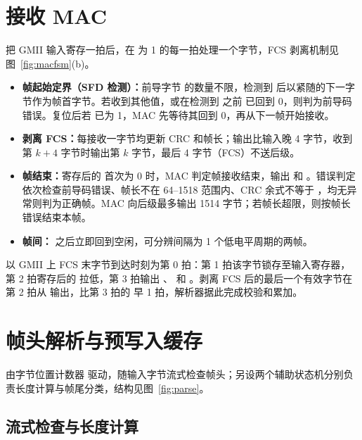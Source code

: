 \section{接收 MAC}\label{sec:macrx}

 把 GMII 输入寄存一拍后，在  为 1 的每一拍处理一个字节，FCS 剥离机制见图~\ref{fig:macfsm}(b)。
\begin{itemize}
  \item \textbf{帧起始定界（SFD 检测）：}前导字节  的数量不限，检测到  后以紧随的下一字节作为帧首字节。若收到其他值，或在检测到  之前  已回到 0，则判为前导码错误。复位后若  已为 1，MAC 先等待其回到 0，再从下一帧开始接收。
  \item \textbf{剥离 FCS：}每接收一字节均更新 CRC 和帧长；输出比输入晚 4 字节，收到第 $k+4$ 字节时输出第 $k$ 字节，最后 4 字节（FCS）不送后级。
  \item \textbf{帧结束：}寄存后的  首次为 0 时，MAC 判定帧接收结束，输出  和 。错误判定依次检查前导码错误、帧长不在 64--1518 范围内、CRC 余式不等于 ，均无异常则判为正确帧。MAC 向后级最多输出 1514 字节；若帧长超限，则按帧长错误结束本帧。
  \item \textbf{帧间：} 之后立即回到空闲，可分辨间隔为 1 个低电平周期的两帧。
\end{itemize}
以 GMII 上 FCS 末字节到达时刻为第 0 拍：第 1 拍该字节锁存至输入寄存器，第 2 拍寄存后的  拉低，第 3 拍输出 、 和 。剥离 FCS 后的最后一个有效字节在第 2 拍从  输出，比第 3 拍的  早 1 拍，解析器据此完成校验和累加。

\section{帧头解析与预写入缓存}

 由字节位置计数器  驱动，随输入字节流式检查帧头；另设两个辅助状态机分别负责长度计算与帧尾分类，结构见图~\ref{fig:parse}。

\subsection{流式检查与长度计算}


